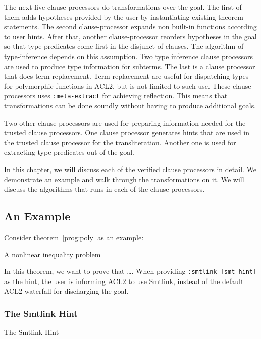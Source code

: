 The next five clause processors do transformations over the goal.
The first of them adds hypotheses provided by the user by instantiating existing
theorem statements.
The second clause-processor expands non built-in functions according to user
hints.
After that, another clause-processor reorders hypotheses in the goal so that
type predicates come first in the disjunct of clauses. The algorithm of
type-inference depends on this assumption.
Two type inference clause processors are used to produce type information for
subterms.
The last is a clause processor that does term replacement. Term replacement are
useful for dispatching types for polymorphic functions in ACL2, but is not
limited to such use.
These clause processors uses \texttt{:meta-extract} for achieving reflection.
This means that transformations can be done soundly without having to produce
additional goals.

Two other clause processors are used for preparing information needed for the
trusted clause processors.
One clause processor generates hints that are used in the trusted clause
processor for the transliteration. Another one is used for extracting type
predicates out of the goal.

In this chapter, we will discuss each of the verified clause processors in
detail. We demonstrate an example and walk through the transformations on it.
We will discuss the algorithms that runs in each of the clause processors.

\subsection{An Example}
Consider theorem~\ref{prog:poly} as an example:
\begin{program}[H]
  \caption{A nonlinear inequality problem}
  \label{prog:poly}
  
\end{program}

In this theorem, we want to prove that \ldots. 
When providing \texttt{:smtlink [smt-hint]} as the hint, the user is informing
ACL2 to use Smtlink, instead of the default ACL2 waterfall for discharging the
goal.

\subsubsection{The Smtlink Hint}
\begin{program}[h]
  \caption{The Smtlink Hint}
  \label{prog:hint}
  
\end{program}


